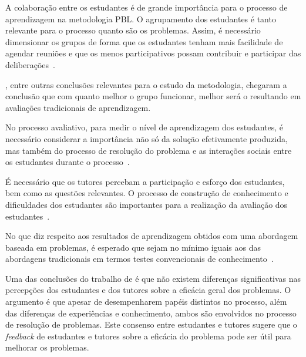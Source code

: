 A colaboração entre os estudantes é de grande importância para o
processo de aprendizagem na metodologia \ac{PBL}.
O agrupamento dos estudantes é tanto relevante para o processo quanto
são os problemas. Assim, é necessário dimensionar os grupos de forma
que os estudantes tenham mais facilidade de agendar reuniões e que
os menos participativos possam contribuir e participar das
deliberações~\cite{savery2015overview, albanese2010problem}.

, entre outras conclusões
relevantes para o estudo da metodologia, chegaram a conclusão
que com quanto melhor o grupo funcionar, melhor será o
resultando em avaliações tradicionais de aprendizagem.

No processo avaliativo, para medir o nível de aprendizagem dos estudantes,
é necessário considerar a importância não só da solução
efetivamente produzida, mas também do
processo de resolução do problema e as interações sociais entre os estudantes durante
o processo~\cite{albanese2010problem}.

É necessário que os tutores percebam
a participação e esforço dos estudantes,
bem como as questões relevantes.
O processo de construção de conhecimento
e dificuldades dos estudantes são
importantes para a realização da avaliação
dos estudantes~\cite{dos2007aplicaccao}.

No que diz respeito aos resultados de aprendizagem
obtidos com uma abordagem baseada em problemas, é esperado que
sejam no mínimo iguais aos das abordagens tradicionais em
termos testes convencionais de conhecimento~\cite{savery2015overview}.


Uma das conclusões do trabalho de  é que
não existem diferenças significativas nas percepções dos estudantes
e dos tutores sobre a eficácia geral dos problemas.
O argumento é que apesar de desempenharem papéis distintos
no processo, além das diferenças de experiências e conhecimento,
ambos são envolvidos no processo de resolução de problemas.
Este consenso entre estudantes e tutores sugere que o \textit{feedback} de estudantes
e tutores sobre a eficácia do problema pode ser útil para melhorar
os problemas.
